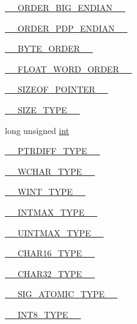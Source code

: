 \begin{DoxyCompactItemize}
\hyperlink{CMakeCache_8txt_aadebb1c0721f9b0a30fe99e903ab7379}{\+\_\+\+\_\+\+O\+R\+D\+E\+R\+\_\+\+B\+I\+G\+\_\+\+E\+N\+D\+I\+A\+N\+\_\+\+\_\+}
\item 
\hyperlink{CMakeCache_8txt_a1d768fc4923117ddc111812917d014f1}{\+\_\+\+\_\+\+O\+R\+D\+E\+R\+\_\+\+P\+D\+P\+\_\+\+E\+N\+D\+I\+A\+N\+\_\+\+\_\+}
\item 
\hyperlink{CMakeCache_8txt_a06b21194cf5550fb37cc1282001bdc0e}{\+\_\+\+\_\+\+B\+Y\+T\+E\+\_\+\+O\+R\+D\+E\+R\+\_\+\+\_\+}
\item 
\hyperlink{CMakeCache_8txt_af83df19811ef575ae2b34e8c904a0408}{\+\_\+\+\_\+\+F\+L\+O\+A\+T\+\_\+\+W\+O\+R\+D\+\_\+\+O\+R\+D\+E\+R\+\_\+\+\_\+}
\item 
\hyperlink{CMakeCache_8txt_a1ee656ff8807634813d40465fb2bcdc1}{\+\_\+\+\_\+\+S\+I\+Z\+E\+O\+F\+\_\+\+P\+O\+I\+N\+T\+E\+R\+\_\+\+\_\+}
\item 
\hyperlink{CMakeCache_8txt_afad16a5dece04ae3a5d68fc746889cdd}{\+\_\+\+\_\+\+S\+I\+Z\+E\+\_\+\+T\+Y\+P\+E\+\_\+\+\_\+}
\item 
long unsigned \hyperlink{CMakeCache_8txt_a79a3d8790b2588b09777910863574e09}{int}
\item 
\hyperlink{CMakeCache_8txt_a2e569667c74a773d6110a55fb19fe7d7}{\+\_\+\+\_\+\+P\+T\+R\+D\+I\+F\+F\+\_\+\+T\+Y\+P\+E\+\_\+\+\_\+}
\item 
\hyperlink{CMakeCache_8txt_a20f76e5c58ddc0926b85e9093730c9ae}{\+\_\+\+\_\+\+W\+C\+H\+A\+R\+\_\+\+T\+Y\+P\+E\+\_\+\+\_\+}
\item 
\hyperlink{CMakeCache_8txt_ab9eb6de4ef3e35d820fa14bf279673c6}{\+\_\+\+\_\+\+W\+I\+N\+T\+\_\+\+T\+Y\+P\+E\+\_\+\+\_\+}
\item 
\hyperlink{CMakeCache_8txt_add72759aac6536e641bc2e8c12366d4b}{\+\_\+\+\_\+\+I\+N\+T\+M\+A\+X\+\_\+\+T\+Y\+P\+E\+\_\+\+\_\+}
\item 
\hyperlink{CMakeCache_8txt_ae27a42a4b7ff92c051bf4badd2702611}{\+\_\+\+\_\+\+U\+I\+N\+T\+M\+A\+X\+\_\+\+T\+Y\+P\+E\+\_\+\+\_\+}
\item 
\hyperlink{CMakeCache_8txt_a7e380349dd3aa6cea0d744c2e90e4721}{\+\_\+\+\_\+\+C\+H\+A\+R16\+\_\+\+T\+Y\+P\+E\+\_\+\+\_\+}
\item 
\hyperlink{CMakeCache_8txt_af91b17fdb800ffc733b2eddf51172eac}{\+\_\+\+\_\+\+C\+H\+A\+R32\+\_\+\+T\+Y\+P\+E\+\_\+\+\_\+}
\item 
\hyperlink{CMakeCache_8txt_a2c74d832cde290cb39ee58eda6214a78}{\+\_\+\+\_\+\+S\+I\+G\+\_\+\+A\+T\+O\+M\+I\+C\+\_\+\+T\+Y\+P\+E\+\_\+\+\_\+}
\item 
\hyperlink{CMakeCache_8txt_a7068c995e5075e4589201a350d1cefca}{\+\_\+\+\_\+\+I\+N\+T8\+\_\+\+T\+Y\+P\+E\+\_\+\+\_\+}

\end{DoxyCompactItemize}
